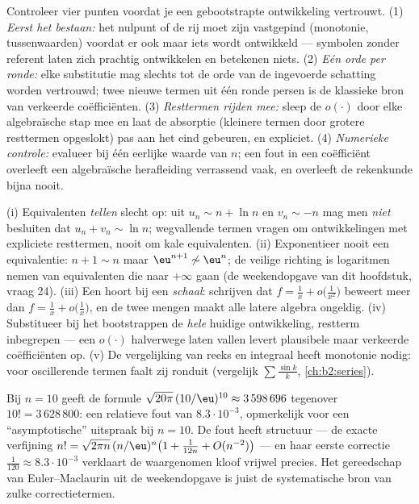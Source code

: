 \begin{method}\label{met:b2:comparison:checklist}
Controleer vier punten voordat je een gebootstrapte ontwikkeling
vertrouwt. (1) \emph{Eerst het bestaan:} het nulpunt of de rij
moet zijn vastgepind (monotonie, tussenwaarden) voordat er ook maar
iets wordt ontwikkeld --- symbolen zonder referent laten zich
prachtig ontwikkelen en betekenen niets. (2) \emph{Eén orde per
ronde:} elke substitutie mag slechts tot de orde van de ingevoerde
schatting worden vertrouwd; twee nieuwe termen uit één ronde
persen is de klassieke bron van verkeerde coëfficiënten. (3)
\emph{Resttermen rijden mee:} sleep de $o(\cdot)$ door elke
algebraïsche stap mee en laat de absorptie (kleinere termen door
grotere resttermen opgeslokt) pas aan het eind gebeuren, en
expliciet. (4) \emph{Numerieke controle:} evalueer bij één
eerlijke waarde van $n$; een fout in een coëfficiënt overleeft een
algebraïsche herafleiding verrassend vaak, en overleeft de
rekenkunde bijna nooit.
\end{method}

\begin{remark}\label{rem:b2:comparison:pitfalls}
(i) Equivalenten \emph{tellen} slecht op: uit $u_n \sim n + \ln n$
en $v_n \sim -n$ mag men \emph{niet} besluiten dat $u_n + v_n \sim
\ln n$; wegvallende termen vragen om ontwikkelingen met expliciete
resttermen, nooit om kale equivalenten. (ii) Exponentieer nooit een
equivalentie: $n + 1 \sim n$ maar $\eu^{n+1} \not\sim \eu^n$; de
veilige richting is logaritmen nemen van equivalenten die naar
$+\infty$ gaan (de weekendopgave van dit hoofdstuk, vraag 24).
(iii) Een  hoort bij een \emph{schaal}:
schrijven dat $f = \frac1x + o\bigl(\frac1{x^2}\bigr)$ beweert
meer dan $f = \frac1x + o\bigl(\frac1x\bigr)$, en de twee mengen
maakt alle latere algebra ongeldig. (iv) Substitueer bij het
bootstrappen de \emph{hele} huidige ontwikkeling, restterm
inbegrepen --- een $o(\cdot)$ halverwege laten vallen levert
plausibele maar verkeerde coëfficiënten op. (v) De vergelijking
van reeks en integraal heeft monotonie nodig: voor oscillerende
termen faalt zij ronduit (vergelijk $\sum\frac{\sin k}k$,
\cref{ch:b2:series}).
\end{remark}

\begin{example}\label{ex:b2:comparison:stirlingnum}
Bij $n = 10$ geeft de formule $\sqrt{20\pi}\,(10/\eu)^{10}
\approx 3\,598\,696$ tegenover $10! = 3\,628\,800$: een relatieve
fout van $8.3\cdot10^{-3}$, opmerkelijk voor een
``asymptotische'' uitspraak bij $n = 10$. De fout heeft structuur
--- de exacte verfijning $n! = \sqrt{2\pi n}\,(n/\eu)^n\bigl(1 +
\frac1{12n} + O(n^{-2})\bigr)$ --- en haar eerste correctie
$\frac1{120} \approx 8.3\cdot10^{-3}$ verklaart de waargenomen
kloof vrijwel precies. Het gereedschap van Euler--Maclaurin uit de
weekendopgave is juist de systematische bron van zulke
correctietermen.
\end{example}

